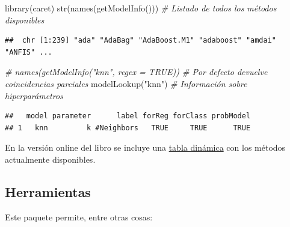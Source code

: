\documentclass[
  spanish,
]{book}
\newenvironment{Shaded}{\begin{snugshade}}{\end{snugshade}}
\newcommand{\CommentTok}[1]{\textcolor[rgb]{0.56,0.35,0.01}{\textit{#1}}}
\newcommand{\FunctionTok}[1]{\textcolor[rgb]{0.00,0.00,0.00}{#1}}
\newcommand{\NormalTok}[1]{#1}
\newcommand{\StringTok}[1]{\textcolor[rgb]{0.31,0.60,0.02}{#1}}
\theoremstyle{break}
\theoremstyle{definition}
\theoremstyle{definition}
\theoremstyle{definition}
\theoremstyle{definition}
\theoremstyle{remark}
\begin{document}
\begin{Shaded}
\begin{Highlighting}[]
\FunctionTok{library}\NormalTok{(caret)}
\FunctionTok{str}\NormalTok{(}\FunctionTok{names}\NormalTok{(}\FunctionTok{getModelInfo}\NormalTok{())) }\CommentTok{\# Listado de todos los métodos disponibles}
\end{Highlighting}
\end{Shaded}

\begin{verbatim}
##  chr [1:239] "ada" "AdaBag" "AdaBoost.M1" "adaboost" "amdai" "ANFIS" ...
\end{verbatim}

\begin{Shaded}
\begin{Highlighting}[]
\CommentTok{\# names(getModelInfo("knn", regex = TRUE)) \# Por defecto devuelve coincidencias parciales}
\FunctionTok{modelLookup}\NormalTok{(}\StringTok{"knn"}\NormalTok{)  }\CommentTok{\# Información sobre hiperparámetros}
\end{Highlighting}
\end{Shaded}

\begin{verbatim}
##   model parameter      label forReg forClass probModel
## 1   knn         k #Neighbors   TRUE     TRUE      TRUE
\end{verbatim}

En la versión online del libro se incluye una \href{https://rubenfcasal.github.io/aprendizaje_estadistico/caret.html}{tabla dinámica} con los métodos actualmente disponibles.

\hypertarget{herramientas}{%
\subsection{Herramientas}\label{herramientas}}

Este paquete permite, entre otras cosas:
\end{document}
